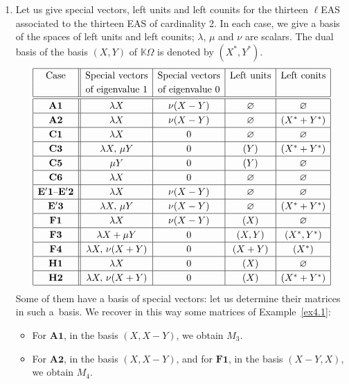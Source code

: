 \documentclass[pdftex]{sigma}
\numberwithin{equation}{section}
\begin{document}
\begin{Example}\quad
\begin{enumerate}\itemsep=0pt
\item[(1)] Let us give special vectors, left units and left counits for the thirteen $\ell$EAS associated to the thirteen EAS of cardinality 2. In each case, we give a basis of the spaces of left units and left counits; $\lambda$, $\mu$ and $\nu$ are scalars.
The dual basis of the basis $(X,Y)$ of $\mathbb{K}\Omega$ is denoted by $(X^*,Y^*)$.
$$\renewcommand{\arraystretch}{1.2} \begin{array}{|c||c|c|c|c|}
\hline \text{Case}&\text{Special vectors}&\text{Special vectors}&\text{Left units}&\text{Left conits}\\
&\text{of eigenvalue 1}&\text{of eigenvalue 0}&&\\
\hline \hline \mathbf{A1}&\lambda X&\nu(X-Y)&\varnothing&\varnothing\\
\hline \mathbf{A2}&\lambda X&\nu(X-Y)&\varnothing&(X^*+Y^*)\\
\hline \mathbf{C1}&\lambda X&0&\varnothing&\varnothing\\
\hline \mathbf{C3}&\lambda X,\, \mu Y&0&(Y)&(X^*+Y^*)\\
\hline \mathbf{C5}&\mu Y&0&(Y)&\varnothing\\
\hline \mathbf{C6}&\lambda X&0&\varnothing&\varnothing\\
\hline \mathbf{E'1}\text{--}\mathbf{E'2}&\lambda X&\nu(X-Y)&\varnothing&\varnothing\\
\hline \mathbf{E'3}&\lambda X,\, \mu Y&\nu(X-Y)&\varnothing&(X^*+Y^*)\\
\hline \mathbf{F1}&\lambda X&\nu(X-Y)&(X)&\varnothing\\
\hline \mathbf{F3}&\lambda X+\mu Y&0&(X,Y)&(X^*,Y^*)\\
\hline \mathbf{F4}&\lambda X,\, \nu(X+Y)&0&(X+Y)&(X^*)\\
\hline \mathbf{H1}&\lambda X&0&(X)&\varnothing\\
\hline \mathbf{H2}&\lambda X,\, \nu(X+Y)&0&(X)&(X^*+Y^*)\\
\hline \end{array}$$
Some of them have a basis of special vectors: let us determine their matrices in such a~basis. We recover in this way some matrices of Example~\ref{ex4.1}:
\begin{itemize}\itemsep=0pt
\item For $\mathbf{A1}$, in the basis $(X,X-Y)$, we obtain $M_3$.
\item For $\mathbf{A2}$, in the basis $(X,X-Y)$, and for $\mathbf{F1}$, in the basis $(X-Y,X)$, we obtain $M_4$.

\end{itemize}
\end{enumerate}
\end{Example}
\end{document}
